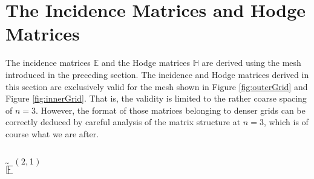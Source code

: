 \section{The Incidence Matrices and Hodge Matrices}

The incidence matrices $\mathbb{E}$ and the Hodge matrices $\mathbb{H}$ are derived using the mesh introduced in the preceding section. The incidence and Hodge matrices derived in this section are exclusively valid for the mesh shown in Figure \ref{fig:outerGrid} and Figure \ref{fig:innerGrid}. That is, the validity is limited to the rather coarse spacing of $n = 3$. However, the format of those matrices belonging to denser grids can be correctly deduced by careful analysis of the matrix structure at $n = 3$, which is of course what we are after.

\subsection{$\tilde{\mathbb{E}}^{(2,1)}$}

